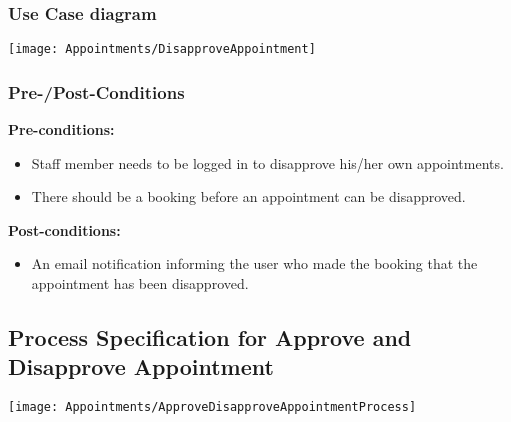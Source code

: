 \subsubsection{Use Case diagram}
\texttt{[image: Appointments/DisapproveAppointment]}

\subsubsection{Pre-/Post-Conditions}\textbf{Pre-conditions:} 
	\begin{itemize}
		\item Staff member needs to be logged in to disapprove his/her own appointments.
		\item There should be a booking before an appointment can be disapproved.
	\end{itemize}
\textbf{ Post-conditions:} 
	\begin{itemize}
		\item An email notification informing the user who made the booking that the appointment has been disapproved.
	\end{itemize}	

\subsection{Process Specification for Approve and Disapprove Appointment}
	\texttt{[image: Appointments/ApproveDisapproveAppointmentProcess]}	